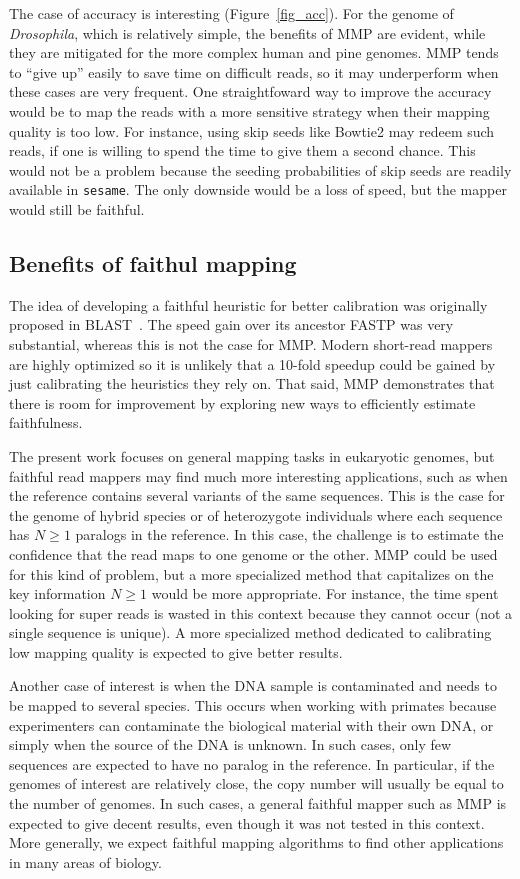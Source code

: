 \documentclass[a4,center,fleqn]{NAR}
\begin{document}
The case of accuracy is interesting (Figure~\ref{fig_acc}). For  the
genome of \textit{Drosophila}, which is relatively simple, the benefits of
MMP  are evident, while they are mitigated for the more complex human and
pine genomes. MMP tends to ``give up'' easily to save time on difficult
reads, so it may underperform when these cases are very frequent. One
straightfoward way to improve the accuracy would be to map the reads with
a more sensitive strategy when their mapping quality is too low. For
instance, using skip seeds like Bowtie2 may redeem such reads, if one is
willing to spend the time to give them a second chance. This would not be
a problem because the seeding probabilities of skip seeds are readily
available in \texttt{sesame}. The only downside would be a loss of speed,
but the mapper would still be faithful.


\subsection{Benefits of faithul mapping}

The idea of developing a faithful heuristic for better calibration was
originally proposed in BLAST~\cite{pmid2231712}. The speed gain over its
ancestor FASTP was very substantial, whereas this is not the case for MMP.
Modern short-read mappers are highly optimized so it is unlikely that a
10-fold speedup could be gained by just calibrating the heuristics they
rely on. That said, MMP demonstrates that there is room for improvement by
exploring new ways to efficiently estimate faithfulness.

The present work focuses on general mapping tasks in eukaryotic genomes,
but faithful read mappers may find much more interesting applications,
such as when the reference contains several variants of the same
sequences. This is the case for the genome of hybrid species or of
heterozygote individuals where each sequence has $N \geq 1$ paralogs in
the reference. In this case, the challenge is to estimate the confidence
that the read maps to one genome or the other. MMP could be used for this
kind of problem, but a more specialized method that capitalizes on the key
information $N \geq 1$ would be more appropriate. For instance, the time
spent looking for super reads is wasted in this context because they
cannot occur (not a single sequence is unique). A more specialized method
dedicated to calibrating low mapping quality is expected to give better
results.

Another case of interest is when the DNA sample is contaminated and needs
to be mapped to several species. This occurs when working with primates
because experimenters can contaminate the biological material with their
own DNA, or simply when the source of the DNA is unknown. In such cases,
only few sequences are expected to have no paralog in the reference. In
particular, if the genomes of interest are relatively close, the copy
number will usually be equal to the number of genomes. In such cases, a
general faithful mapper such as MMP is expected to give decent results,
even though it was not tested in this context. More generally, we expect
faithful mapping algorithms to find other applications in many areas of
biology. 
\end{document}
